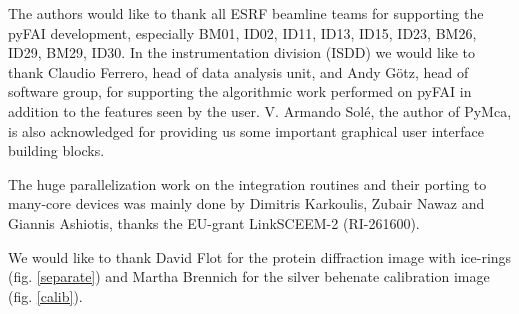\documentclass[preprint]{iucr}
\begin{document}

The authors would like to thank all ESRF beamline teams for supporting the
pyFAI development, especially BM01, ID02, ID11, ID13, ID15, ID23, BM26, ID29, BM29,
ID30. In the instrumentation division (ISDD) we would like to thank Claudio
Ferrero, head of data analysis unit, and Andy G\"otz, head of software group, for
supporting the algorithmic work performed on pyFAI in addition to the features
seen by the user.
V. Armando Solé, the author of PyMca, is also acknowledged for providing us some
important graphical user interface building blocks.

The huge parallelization work on the integration routines and their porting to
many-core devices was mainly done by Dimitris Karkoulis, Zubair Nawaz and Giannis Ashiotis,
thanks the EU-grant LinkSCEEM-2 (RI-261600).

We would like to thank David Flot for the protein
diffraction image with ice-rings (fig. \ref{separate}) and Martha Brennich for
the silver behenate calibration image (fig. \ref{calib}).
\end{document}
